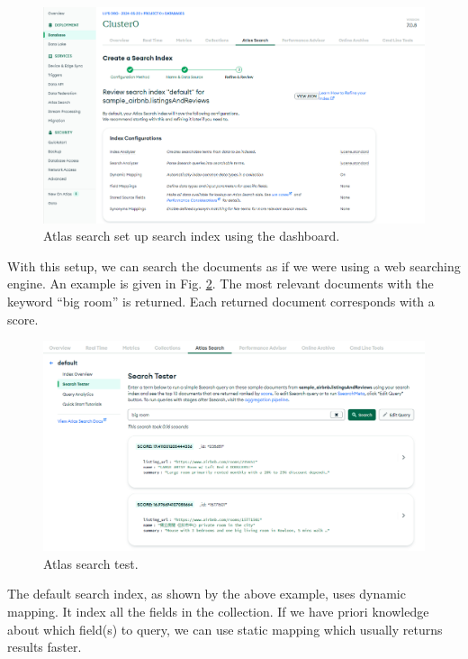 \begin{figure}[htbp]
	\centering
	\includegraphics[width=\textwidth]{chapters/part-3/figures/atlas_search_dashboard.png}
	\caption{Atlas search set up search index using the dashboard.} \label{ch:database:atlassearchdashboard}
\end{figure}

With this setup, we can search the documents as if we were using a web searching engine. An example is given in Fig. \ref{ch:database:atlassearchtest}. The most relevant documents with the keyword ``big room'' is returned. Each returned document corresponds with a score.

\begin{figure}[htbp]
	\centering
	\includegraphics[width=\textwidth]{chapters/part-3/figures/atlas_search_test.png}
	\caption{Atlas search test.} \label{ch:database:atlassearchtest}
\end{figure}

The default search index, as shown by the above example, uses dynamic mapping. It index all the fields in the collection. If we have priori knowledge about which field(s) to query, we can use static mapping which usually returns results faster. 


